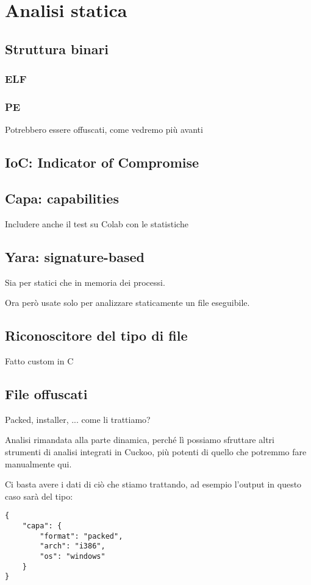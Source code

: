 \chapter{Analisi statica}

\section{Struttura binari}

\subsection{ELF}

\subsection{PE}
Potrebbero essere offuscati, come vedremo più avanti

\section{IoC: Indicator of Compromise}

\section{Capa: capabilities}
Includere anche il test su Colab con le statistiche

\section{Yara: signature-based}
Sia per statici che in memoria dei processi.

Ora però usate solo per analizzare staticamente un file eseguibile.

\section{Riconoscitore del tipo di file}
Fatto custom in C

\section{File offuscati}
Packed, installer, ... come li trattiamo?

Analisi rimandata alla parte dinamica, perché lì possiamo sfruttare altri strumenti di analisi integrati in Cuckoo, più potenti di quello che potremmo fare manualmente qui.

Ci basta avere i dati di ciò che stiamo trattando, ad esempio l'output in questo caso sarà del tipo:
\begin{code}
\label{code:json_capa_packed}
\begin{verbatim}
{
    "capa": {
        "format": "packed",
        "arch": "i386",
        "os": "windows"
    }
}
\end{verbatim}
\end{code}

